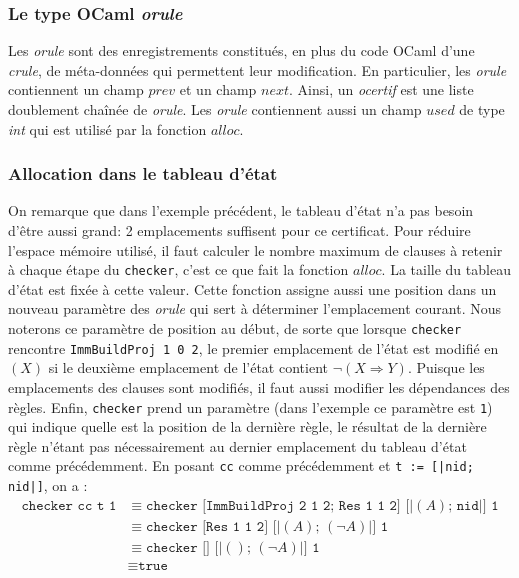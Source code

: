 \documentclass[11pt]{article}
\begin{document}
\subsubsection{Le type OCaml \textit{orule}}

 Les \textit{orule} sont des enregistrements constitués, en plus du code OCaml d'une \textit{crule}, de méta-données qui permettent leur modification. En particulier, les \textit{orule} contiennent un champ $prev$ et un champ $next$. Ainsi, un \textit{ocertif} est une liste doublement chaînée de \textit{orule}. Les \textit{orule} contiennent aussi un champ $used$ de type \textit{int} qui est utilisé par la fonction $alloc$.


\subsubsection{Allocation dans le tableau d'état} \label{alloc}

On remarque que dans l'exemple précédent, le tableau d'état n'a pas besoin d'être aussi grand: 2 emplacements suffisent pour ce certificat. Pour réduire l'espace mémoire utilisé, il faut calculer le nombre maximum de clauses à retenir à chaque étape du \texttt{checker}, c'est ce que fait la fonction $alloc$. La taille du tableau d'état est fixée à cette valeur. Cette fonction assigne aussi une position dans un nouveau paramètre des \textit{orule} qui sert à déterminer l'emplacement courant. Nous noterons ce paramètre de position au début, de sorte que lorsque \texttt{checker} rencontre \texttt{ImmBuildProj 1 0 2}, le premier emplacement de l'état est modifié en $(X)$ si le deuxième emplacement de l'état contient $\neg(X \Rightarrow Y)$. Puisque les emplacements des clauses sont modifiés, il faut aussi modifier les dépendances des règles. Enfin, \texttt{checker} prend un paramètre (dans l'exemple ce paramètre est \texttt{1}) qui indique quelle est la position de la dernière règle, le résultat de la dernière règle n'étant pas nécessairement au dernier emplacement du tableau d'état comme précédemment. En posant \texttt{cc} comme précédemment et \texttt{t := [|nid; nid|]}, on a :
\begin{align*}
  \texttt{checker cc t 1} &\equiv \texttt{checker [ImmBuildProj 2 1 2; Res 1 1 2] [|}(A)\texttt{; nid|] 1} \\
    &\equiv \texttt{checker [Res 1 1 2] [|}(A)\texttt{; }(\neg A)\texttt{|] 1} \\
    &\equiv \texttt{checker [] [|}()\texttt{; }(\neg A)\texttt{|] 1} \\
    &\equiv \texttt{true}
\end{align*}
\end{document}
